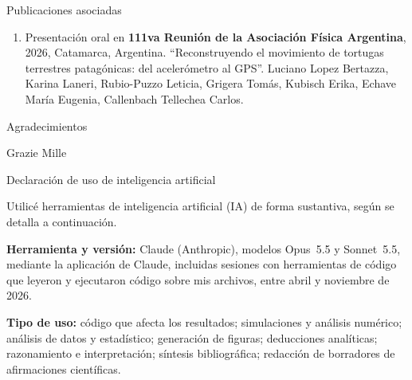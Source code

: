 \documentclass[12pt,screen,twoside,pagebackref]{ibtesis}
\begin{document}
\begin{postliminary}

\begin{seccion}{Publicaciones asociadas}
\begin{enumerate}
  \item Presentación oral en \textbf{111va Reunión de la Asociación Física Argentina}, 2026, Catamarca, Argentina. ``Reconstruyendo el movimiento de tortugas terrestres patagónicas:  del acelerómetro al GPS''. Luciano Lopez Bertazza, Karina Laneri, Rubio-Puzzo Leticia, Grigera Tomás, Kubisch Erika, Echave María Eugenia, Callenbach Tellechea Carlos.
\end{enumerate} 
\end{seccion}
\begin{seccion}{Agradecimientos}

Grazie Mille







\end{seccion}

\begin{seccion}{Declaración de uso de inteligencia artificial}

Utilicé herramientas de inteligencia artificial (IA) de forma sustantiva, según se detalla a continuación.

\textbf{Herramienta y versión:} Claude (Anthropic), modelos Opus~5.5 y Sonnet~5.5, mediante la aplicación de Claude, incluidas sesiones con 
herramientas de código que leyeron y ejecutaron código sobre mis archivos, entre abril y noviembre de 2026.

\textbf{Tipo de uso:} código que afecta los resultados; simulaciones y análisis numérico; análisis de datos y estadístico;
generación de figuras; deducciones analíticas; razonamiento e interpretación; síntesis bibliográfica; redacción de borradores de afirmaciones científicas.


\end{seccion}
\end{postliminary}
\end{document}
